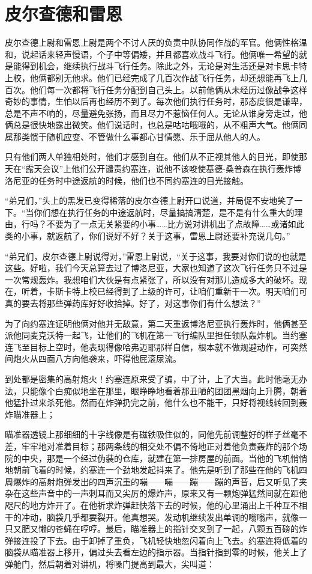 \chapter{皮尔查德和雷恩}
 
    皮尔查德上尉和雷恩上尉是两个不讨人厌的负责中队协同作战的军官。他俩性格温和，说起话来轻声慢语，个子中等偏矮，并且都喜欢战斗飞行。他俩唯一希望的就是能得到机会，继续执行战斗飞行任务。除此之外，无论是对生活还是对卡思卡特上校，他俩都别无他求。他们已经完成了几百次作战飞行任务，却还想能再飞上几百次。他们每一次都将飞行任务分配到自己头上。以前他俩从未经历过像战争这样奇妙的事情，生怕以后再也经历不到了。每次他们执行任务时，那态度很是谦卑，总是不声不响的，尽量避免张扬，而且尽力不惹恼任何人。无论从谁身旁走过，他俩总是很快地露出微笑。他们说话时，也总是咕咕哦哦的，从不粗声大气。他俩同属那类惯于随机应变、不管做什么事都心甘情愿、乐于屈从他人的人。

    只有他们两人单独相处时，他们才感到自在。他们从不正视其他人的目光，即使那天在“露天会议”上他们公开谴责约塞连，说他不该唆使基德-桑普森在执行轰炸博洛尼亚的任务时中途返航的时候，他们也不同约塞连的目光接触。

    “弟兄们，”头上的黑发已变得稀落的皮尔查德上尉开口说道，并局促不安地笑了一下。“当你们想在执行任务的中途返航时，尽量搞搞清楚，是不是有什么重大的理由，行吗？不要为了一点无关紧要的小事……比方说对讲机出了点故障……或诸如此类的小事，就返航了，你们说好不好？关于这事，雷恩上尉还要补充说几句。”

    “弟兄们，皮尔查德上尉说得对，”雷恩上尉说，“关于这事，我要对你们说的也就是这些。好啦，我们今天总算去过了博洛尼亚，大家也知道了这次飞行任务只不过是一次常规轰炸。我想咱们大伙是有点紧张了，所以没有对那儿造成多大的破坏。现在，听着，卡斯卡特上校已经得到了上级的许可，让咱们重新干一次。明天咱们可真的要去将那些弹药库好好收拾掉。好了，对这事你们有什么想法？”

    为了向约塞连证明他俩对他并无敌意，第二天重返博洛尼亚执行轰炸时，他俩甚至派他同麦克沃特一起飞，让他们的飞机在第一飞行编队里担任领队轰炸机。当约塞连飞至目标上空时，他表现得像哈弗迈耶那样自信，根本就不做规避动作，可突然间炮火从四面八方向他袭来，吓得他屁滚尿流。

 


    到处都是密集的高射炮火！约塞连原来受了骗，中了计，上了大当。此时他毫无办法，只能像个白痴似地坐在那里，眼睁睁地看着那丑陋的团团黑烟向上升腾，朝着他猛扑过来杀死他。然而在炸弹扔完之前，他什么也不能干，只好将视线转回到轰炸瞄准器上；

    瞄准器透镜上那细细的十字线像是有磁铁吸住似的，同他先前调整好的样子丝毫不差，牢牢地对准着目标；那两条线的相交处不偏不倚地正对着他负责轰炸的那个场院的中央，那是一个经过伪装的仓库，就建在第一排房屋的前面。当他的飞机悄悄地朝前飞着的时候，约塞连一个劲地发起抖来了。他先是听到了那些在他的飞机四周爆炸的高射炮弹发出的四声沉重的嘣——嘣——蹦——蹦的声音，后又听见了夹杂在这些声音中的一声刺耳而又尖厉的爆炸声，原来又有一颗炮弹猛然间就在距他咫尺的地方炸开了。在他祈求炸弹赶快落下去的时候，他的心里涌出上千种互不相干的冲动，脑袋几乎都要裂开。他真想哭。发动机继续发出单调的嗡嗡声，就像一只又肥又懒的苍蝇在哼哼。最后，瞄准器上的指针交叉到了一起，八颗五百磅的炸弹接连投了下去。由于卸掉了重负，飞机轻快地忽闪着向上飞去。约塞连将低着的脑袋从瞄准器上移开，偏过头去看左边的指示器。当指针指到零的时候，他关上了弹舱门，然后朝着对讲机，将嗓门提高到最大，尖叫道：

